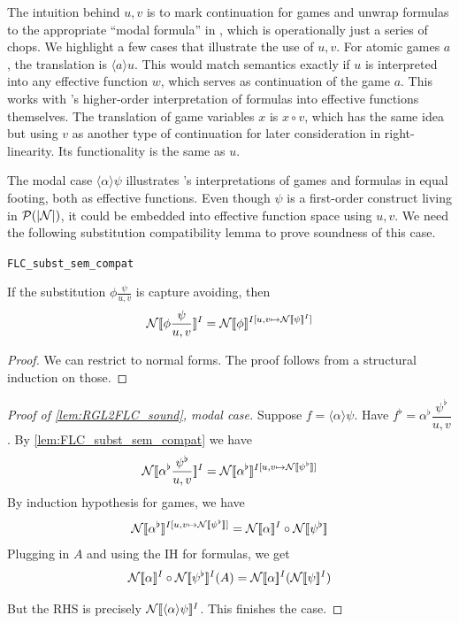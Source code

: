 The intuition behind $u,v$ is to mark continuation for games and unwrap \RGL{} formulas to the appropriate ``modal formula'' in \FLC{}, which is operationally just a series of chops. We highlight a few cases that illustrate the use of $u,v$. For atomic games $a$, the translation is $\langle a\rangle u$. This would match \FLC{} semantics exactly if $u$ is interpreted into any effective function $w$, which serves as continuation of the game $a$. This works with \FLC{}'s higher-order interpretation of formulas into effective functions themselves. The translation of game variables $x$ is $x\circ v$, which has the same idea but using $v$ as another type of continuation for later consideration in right-linearity. Its functionality is the same as $u$.

The modal case $\langle \alpha\rangle\psi$ illustrates \FLC{}'s interpretations of games and formulas in equal footing, both as effective functions. Even though $\psi$ is a first-order construct living in $\mathcal{P}(|\mathcal N|)$, it could be embedded into effective function space using $u,v$. We need the following substitution compatibility lemma to prove soundness of this case.

\begin{blemma}

\texttt{FLC\_subst\_sem\_compat}
\label{lem:FLC_subst_sem_compat} 

If the substitution $\phi\frac{\psi}{u,v}$ is capture avoiding, then
\begin{equation}
\mathcal N[\![ \phi\frac{\psi}{u,v}]\!]^I=\mathcal N[\![ \phi]\!]^{I[u,v\mapsto \mathcal N[\![\psi]\!]^I]}
\end{equation}

\end{blemma}
\begin{proof}
    We can restrict to \FLC{} normal forms. The proof follows from a structural induction on those.
\end{proof}

\begin{proof}[Proof of \autoref{lem:RGL2FLC_sound}, modal case]
    Suppose $f = \langle\alpha\rangle\psi$. Have $f^\flat = \alpha^\flat \dfrac{\psi^\flat}{u,v}$. By \autoref{lem:FLC_subst_sem_compat} we have 
    \[\mathcal N[\![\alpha^\flat\frac{\psi^\flat}{u,v} ]\!]^I = \mathcal N[\![\alpha^\flat]\!]^{I[u,v\mapsto \mathcal N[\![\psi^\flat]\!]]}\] By induction hypothesis for games, we have 
    \[\N\ddl\alpha^\flat\ddr^{I[u,v\mapsto \N\ddl\psi^\flat\ddr]} = \N\ddl\alpha\ddr^I\circ \N\ddl\psi^\flat\ddr \]
    Plugging in $A$ and using the IH for formulas, we get
    \[\N\ddl\alpha\ddr^I\circ \N\ddl\psi^\flat\ddr^I(A)=\N\ddl\alpha\ddr^I( \N\ddl\psi\ddr^I)\]

    But the RHS is precisely $\mathcal N[\![\langle\alpha\rangle\psi]\!]^I$. This finishes the case.
\end{proof}

